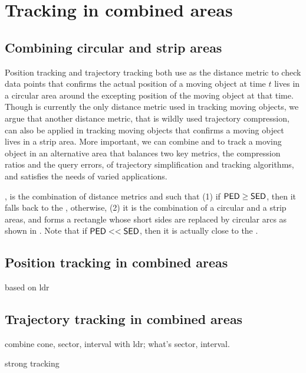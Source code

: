 

\section{Tracking in combined areas}
\label{sec:combine}


\subsection{Combining circular and strip areas}
Position tracking and trajectory tracking both use \sed as the distance metric to check data points that confirms the actual position of a moving object at time $t$ lives in a circular area around the excepting position of the moving object at that time.
Though \sed is currently the only distance metric used in tracking moving objects, we argue that another distance metric, \ped that is wildly used trajectory compression, can also be applied in tracking moving objects that confirms a moving object lives in a strip area. More important, we can combine \sed and \ped to track a moving object in an alternative area that balances two key metrics, \ie the compression ratios and the query errors, of trajectory simplification and tracking algorithms, and satisfies the needs of varied applications.


, is the combination of distance metrics \sed and \ped such that (1) if ${\mathsf{PED}} \ge {\ensuremath {\mathsf{SED}}}$, then it falls back to the \sed, otherwise, (2) it is the combination of a circular and a strip areas, and forms a rectangle whose short sides are replaced by circular arcs as shown in . Note that if ${\mathsf{PED}} << {\mathsf{SED}}$, then it is actually close to the \ped.



\subsection{Position tracking in combined areas}
based on ldr


\subsection{Trajectory tracking in combined areas}

combine cone, sector, interval with ldr; what's sector, interval.


strong tracking

